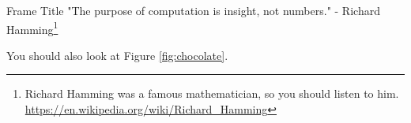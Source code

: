 \documentclass{beamer} %
\begin{document}

\begin{frame}{Frame Title}
    "The purpose of computation is insight, not numbers." - Richard Hamming\footnote{Richard Hamming was a famous mathematician, so you should listen to him. \url{https://en.wikipedia.org/wiki/Richard_Hamming} }
    
    You should also look at Figure \ref{fig:chocolate}. %
\end{frame}

\end{document}
